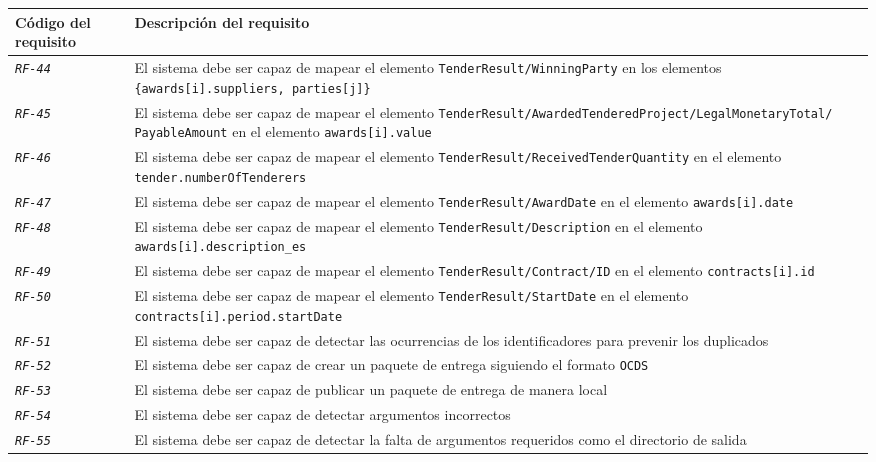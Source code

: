 \begin{longtable}{|| M{3cm} | M{12cm} ||}
                \hline
\newpage
                \hline
                    Código del requisito & Descripción del requisito \\
                \hline
                \hline
                    \texttt{\textit{RF-44}} & El sistema debe ser capaz de mapear el elemento \texttt{TenderResult/WinningParty} en los elementos \texttt{\{awards[i].suppliers, parties[j]\}} \\
                \hline
                    \texttt{\textit{RF-45}} & El sistema debe ser capaz de mapear el elemento \texttt{TenderResult/AwardedTenderedProject/LegalMonetaryTotal/
                    PayableAmount} en el elemento \texttt{awards[i].value} \\
                \hline
                    \texttt{\textit{RF-46}} & El sistema debe ser capaz de mapear el elemento \texttt{TenderResult/ReceivedTenderQuantity} en el elemento \texttt{tender.numberOfTenderers} \\
                \hline
                    \texttt{\textit{RF-47}} & El sistema debe ser capaz de mapear el elemento \texttt{TenderResult/AwardDate} en el elemento \texttt{awards[i].date} \\
                \hline
                    \texttt{\textit{RF-48}} & El sistema debe ser capaz de mapear el elemento \texttt{TenderResult/Description} en el elemento \texttt{awards[i].description\_es} \\
                \hline
                    \texttt{\textit{RF-49}} & El sistema debe ser capaz de mapear el elemento \texttt{TenderResult/Contract/ID} en el elemento \texttt{contracts[i].id} \\
                \hline
                    \texttt{\textit{RF-50}} & El sistema debe ser capaz de mapear el elemento \texttt{TenderResult/StartDate} en el elemento \texttt{contracts[i].period.startDate} \\
                \hline
                    \texttt{\textit{RF-51}} & El sistema debe ser capaz de detectar las ocurrencias de los identificadores para prevenir los duplicados \\
                \hline
                    \texttt{\textit{RF-52}} & El sistema debe ser capaz de crear un paquete de entrega siguiendo el formato \texttt{OCDS} \\
                \hline
                    \texttt{\textit{RF-53}} & El sistema debe ser capaz de publicar un paquete de entrega de manera local \\
                \hline
                    \texttt{\textit{RF-54}} & El sistema debe ser capaz de detectar argumentos incorrectos \\
                \hline
                    \texttt{\textit{RF-55}} & El sistema debe ser capaz de detectar la falta de argumentos requeridos como el directorio de salida \\
                \hline
            \end{longtable}
            \addtocounter{table}{-1}
            

